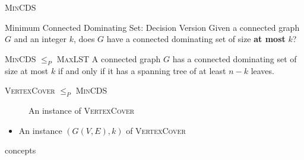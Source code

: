 \documentclass{beamer}
\begin{document}
\begin{frame}{\textsc{MinCDS}}
   \begin{exampleblock}{Minimum Connected Dominating Set: Decision Version}
     Given a connected graph $G$ and an integer $k$, does $G$ have a connected dominating set of size \textbf{at most} $k$?
   \end{exampleblock} 

   \begin{block}{\textsc{MinCDS} $\leq_{P}$ \textsc{MaxLST}} 
   A connected graph $G$ has a connected dominating set of size at most $k$ if and only if it has a spanning tree of at least $n-k$ leaves. 
   \end{block}
\end{frame}

\begin{frame}{\textsc{VertexCover} $\leq_{P}$ \textsc{MinCDS}}
    \begin{figure}
      \caption{An instance of \textsc{VertexCover}}
    \end{figure}
    \begin{itemize}
        \item An instance $(G(V,E),k)$ of \textsc{VertexCover}
    \end{itemize} concepts
\end{frame}
\end{document}
